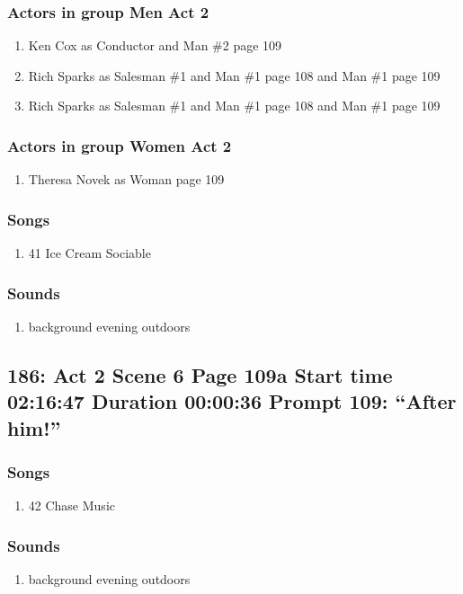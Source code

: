 \subsubsection{Actors in group Men Act 2}
\begin{enumerate}
\item Ken Cox as Conductor and Man \#2 page 109
\item Rich Sparks as Salesman \#1 and Man \#1 page 108 and Man \#1 page 109
\item Rich Sparks as Salesman \#1 and Man \#1 page 108 and Man \#1 page 109
\end{enumerate}
\subsubsection{Actors in group Women Act 2}
\begin{enumerate}
\item Theresa Novek as Woman page 109
\end{enumerate}

\subsubsection{Songs}
\begin{enumerate}
\item 41 Ice Cream Sociable
\end{enumerate}\subsubsection{Sounds}
\begin{enumerate}
\item background evening outdoors
\end{enumerate}
\subsection{186: Act 2 Scene 6 Page 109a Start time 02:16:47 Duration 00:00:36 Prompt 109: ``After him!''}
\subsubsection{Songs}
\begin{enumerate}
\item 42 Chase Music
\end{enumerate}\subsubsection{Sounds}
\begin{enumerate}
\item background evening outdoors
\end{enumerate}
